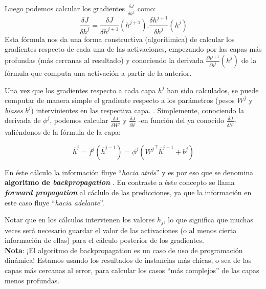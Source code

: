 Luego podemos calcular los gradientes $\frac{\delta J}{\delta h^j}$ como:
\begin{equation*}
    \frac{\delta J}{\delta h^j} = \frac{\delta J}{\delta h^{j+1}}(h^{j+1}) . \frac{\delta h^{j+1}}{\delta h^j}(h^j)
\end{equation*}
Esta fórmula nos da una forma constructiva (algorítimica) de calcular los gradientes respecto de cada una de las activaciones, empezando por las capas más profundas (más cercanas al resultado) y conociendo la derivada $\frac{\delta h^{j+1}}{\delta h^j}(h^j)$ de la fórmula que computa una activación a partir de la anterior.  

Una vez que los gradientes respecto a cada capa ${h}^{j}$ han sido calculados, se puede computar de manera simple el gradiente respecto a los parámetros (pesos $W^j$ y \textit{biases} $b^j$) intervinientes en las respectiva capa. \cite{lecun-dl}. Simplemente, conociendo la derivada de $\phi^j$, podemos calcular $\frac{\delta J}{\delta W^j}$ y $\frac{\delta J}{\delta b^j}$ -en función del ya conocido $\frac{\delta J}{\delta h^j}$- valiéndonos de la fórmula de la capa:

\begin{equation*}
    \bar{h}^j = f^j(\bar{h}^{j-1}) = \phi^j( {W^j}^\top \bar{h}^{j-1} + b^j)
\end{equation*}

En éste cálculo la información fluye ``\textit{hacia atrás}'' y es por eso que se denomina \textbf{algoritmo de \textit{backpropagation}} \cite{backpropagation1}. En contraste a éste concepto se llama \textbf{\textit{forward propagation}} al cáclulo de las predicciones, ya que la información en este caso fluye ``\textit{hacia adelante}''.

Notar que en los cálculos intervienen los valores $h_j$, lo que significa que muchas veces será necesario guardar el valor de las activaciones (o al menos cierta información de ellas) para el cálculo posterior de los gradientes. \\

\textbf{Nota}: ¡El algoritmo de backpropagation es un caso de uso de programación dinámica! Estamos usando los resultados de instancias más chicas, o sea de las capas más cercanas al error, para calcular los casos ``más complejos'' de las capas menos profundas. \\

